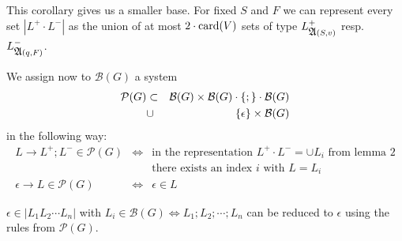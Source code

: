 This corollary gives us a smaller base. For fixed $S$ and $F$ we can represent
every set $|L^+ \cdot L^-|$ as the union of at most $2 \cdot \mathrm{card}({V})$ sets of
type $L^+_{\mbox{$\mathfrak{A}$}(S, v)}$ resp.\ $L^-_{\mbox{$\mathfrak{A}$}(q, F)}$.

We assign now to $\mathcal{B}(G)$ a system 
\begin{eqnarray*} 
\mathcal{P}(G) & \subset & \mathcal{B}(G) \times \mathcal{B}(G) \cdot \mbox{$\{;\}$}
\cdot \mathcal{B}(G) \\
& \cup & \mbox{$\{\epsilon\}$} \times \mathcal{B}(G)
\end{eqnarray*}
in the following way:
\begin{eqnarray*}
L \to L^+ ; L^- \in \mathcal{P}(G) & \iff & \text{in the representation } L^+
  \cdot L^- = \cup L_i \text{ from lemma 2} \\
  & & \text {there exists an index $i$ with $L = L_i$} \\
\epsilon \to L \in \mathcal{P}(G) & \iff & \epsilon \in L
\end{eqnarray*}

\bigskip
\begin{lemma}
$\epsilon \in |L_1 L_2 \cdots L_n|$ with $L_i \in \mathcal{B}(G) \iff
L_1;L_2;\cdots ;L_n$ can be reduced to $\epsilon$ using the rules from
$\mathcal{P}(G)$.
\end{lemma}

